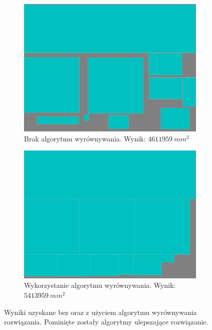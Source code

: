 \documentclass[11pt,a4paper,oneside]{article}
\begin{document}
\begin{figure}[H]
\begin{subfigure}{.49\textwidth}
    \centering
    \includegraphics[width=.95\linewidth]{res/resultRaw.pdf}
    \caption{Brak algorytmu wyrównywania. Wynik: $4611959~\si{mm^2}$}
\end{subfigure}
\hfill
\begin{subfigure}{.49\textwidth}
    \centering
    \includegraphics[width=.95\linewidth]{res/resultImp.pdf}
    \caption{Wykorzystanie algorytmu wyrównywania. Wynik: $5413959~\si{mm^2}$}
\end{subfigure}
\caption{Wyniki uzyskane bez oraz z użyciem algorytmu wyrównywania rozwiązania. Pominięte zostały algorytmy ulepszające rozwiązanie.}
\label{fig:fig2}
\end{figure}
\end{document}
